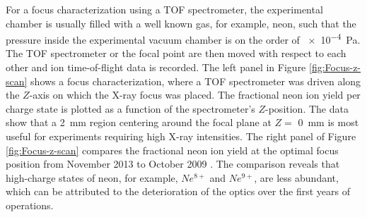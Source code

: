 %
For a focus characterization using a TOF spectrometer, the experimental chamber is usually filled with a well known gas, for example, neon, such that the pressure inside the experimental vacuum chamber is on the order of \SI{e-4}{\pascal}. The TOF spectrometer or the focal point are then moved with respect to each other and ion time-of-flight data is recorded. The left panel in Figure \ref{fig:Focus-z-scan} shows a focus characterization, where a TOF spectrometer was driven along the $Z$-axis on which the X-ray focus was placed. The fractional neon ion yield per charge state is plotted as a function of the spectrometer's $Z$-position. The data show that a \SI{2}{\milli\meter} region centering around the focal plane at $Z=$ \SI{0}{\milli\meter} is most useful for experiments requiring high X-ray intensities. The right panel of Figure \ref{fig:Focus-z-scan} compares the fractional neon ion yield at the optimal focus position from November \num{2013} \citep{Bucher-2016-Unpublished} to October \num{2009} \citep{Doumy-2011-PRL}. The comparison reveals that high-charge states of neon, for example, $Ne^{8+}$ and $Ne^{9+}$, are less abundant, which can be attributed to the deterioration of the optics over the first years of operations.
%
%
%
